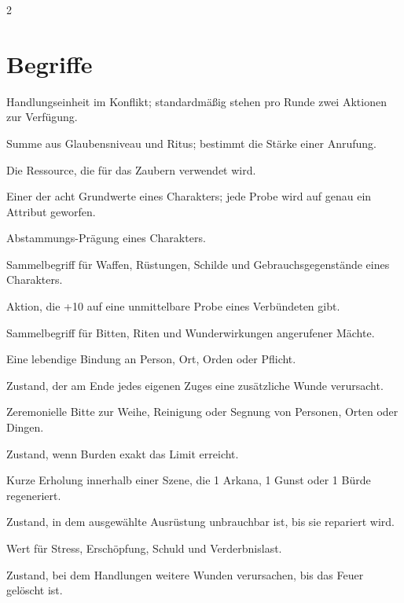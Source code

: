 \label{ch:glossar}

\begin{multicols*}{2}
\section{Begriffe}\label{sec:begriffe}
\begin{description}[style=nextline,leftmargin=0pt]
\item[\textbf{Aktion}] Handlungseinheit im Konflikt; standardmäßig stehen pro Runde zwei Aktionen zur Verfügung.
\item[\textbf{Anrufungswert}] Summe aus Glaubensniveau und Ritus; bestimmt die Stärke einer Anrufung.
\item[\textbf{Arkana}] Die Ressource, die für das Zaubern verwendet wird.
\item[\textbf{Attribut}] Einer der acht Grundwerte eines Charakters; jede Probe wird auf genau ein Attribut geworfen.
\item[\textbf{Abstammung}] Abstammungs-Prägung eines Charakters.
\item[\textbf{Ausrüstung}] Sammelbegriff für Waffen, Rüstungen, Schilde und Gebrauchsgegenstände eines Charakters.
\item[\textbf{Assistieren}] Aktion, die +10 auf eine unmittelbare Probe eines Verbündeten gibt.
\item[\textbf{Glaube}] Sammelbegriff für Bitten, Riten und Wunderwirkungen angerufener Mächte.
\item[\textbf{Bindung}] Eine lebendige Bindung an Person, Ort, Orden oder Pflicht.
\item[\textbf{Blutend}] Zustand, der am Ende jedes eigenen Zuges eine zusätzliche Wunde verursacht.
\item[\textbf{Segnung}] Zeremonielle Bitte zur Weihe, Reinigung oder Segnung von Personen, Orten oder Dingen.
\item[\textbf{Wendepunkt}] Zustand, wenn Burden exakt das Limit erreicht.
\item[\textbf{Durchatmen}] Kurze Erholung innerhalb einer Szene, die 1 Arkana, 1 Gunst oder 1 Bürde regeneriert.
\item[\textbf{Zerstört}] Zustand, in dem ausgewählte Ausrüstung unbrauchbar ist, bis sie repariert wird.
\item[\textbf{Bürde}] Wert für Stress, Erschöpfung, Schuld und Verderbnislast.
\item[\textbf{Brennend}] Zustand, bei dem Handlungen weitere Wunden verursachen, bis das Feuer gelöscht ist.

\end{description}
\end{multicols*}
